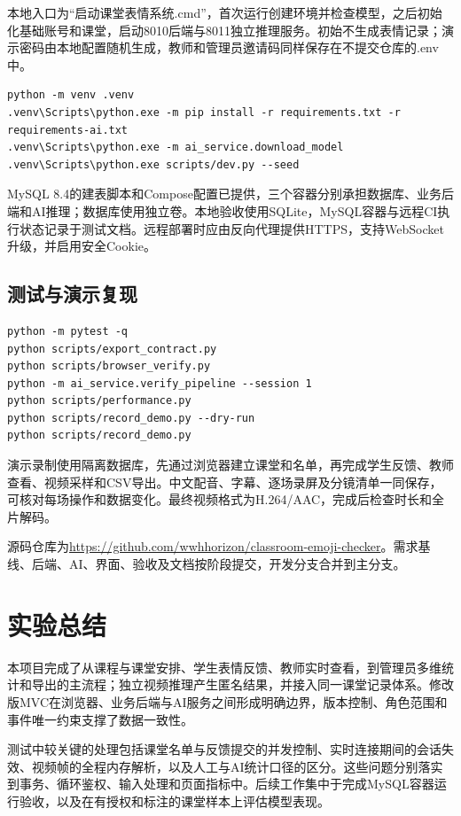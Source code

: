 \documentclass[UTF8,a4paper,zihao=-4,fontset=fandol]{ctexart}
\begin{document}
本地入口为“启动课堂表情系统.cmd”，首次运行创建环境并检查模型，之后初始化基础账号和课堂，启动8010后端与8011独立推理服务。初始不生成表情记录；演示密码由本地配置随机生成，教师和管理员邀请码同样保存在不提交仓库的.env中。

\begin{lstlisting}
python -m venv .venv
.venv\Scripts\python.exe -m pip install -r requirements.txt -r requirements-ai.txt
.venv\Scripts\python.exe -m ai_service.download_model
.venv\Scripts\python.exe scripts/dev.py --seed
\end{lstlisting}

MySQL 8.4的建表脚本和Compose配置已提供，三个容器分别承担数据库、业务后端和AI推理；数据库使用独立卷。本地验收使用SQLite，MySQL容器与远程CI执行状态记录于测试文档。远程部署时应由反向代理提供HTTPS，支持WebSocket升级，并启用安全Cookie。

\subsection{测试与演示复现}

\begin{lstlisting}
python -m pytest -q
python scripts/export_contract.py
python scripts/browser_verify.py
python -m ai_service.verify_pipeline --session 1
python scripts/performance.py
python scripts/record_demo.py --dry-run
python scripts/record_demo.py
\end{lstlisting}

演示录制使用隔离数据库，先通过浏览器建立课堂和名单，再完成学生反馈、教师查看、视频采样和CSV导出。中文配音、字幕、逐场录屏及分镜清单一同保存，可核对每场操作和数据变化。最终视频格式为H.264/AAC，完成后检查时长和全片解码。

源码仓库为\url{https://github.com/wwhhorizon/classroom-emoji-checker}。需求基线、后端、AI、界面、验收及文档按阶段提交，开发分支合并到主分支。

\section{实验总结}

本项目完成了从课程与课堂安排、学生表情反馈、教师实时查看，到管理员多维统计和导出的主流程；独立视频推理产生匿名结果，并接入同一课堂记录体系。修改版MVC在浏览器、业务后端与AI服务之间形成明确边界，版本控制、角色范围和事件唯一约束支撑了数据一致性。

测试中较关键的处理包括课堂名单与反馈提交的并发控制、实时连接期间的会话失效、视频帧的全程内存解析，以及人工与AI统计口径的区分。这些问题分别落实到事务、循环鉴权、输入处理和页面指标中。后续工作集中于完成MySQL容器运行验收，以及在有授权和标注的课堂样本上评估模型表现。
\end{document}
